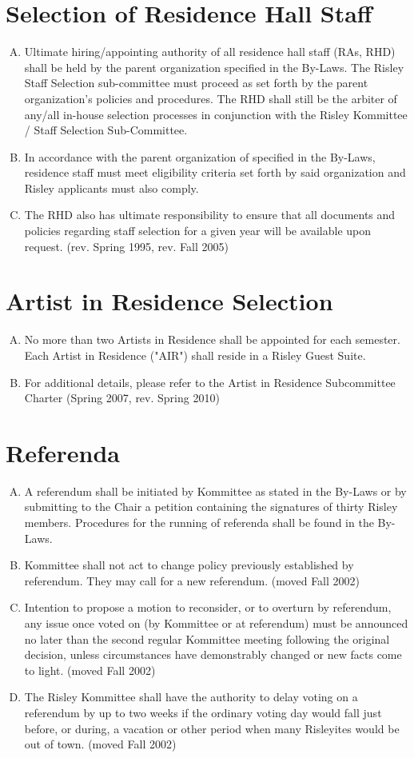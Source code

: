 \documentclass[12pt]{article}
\begin{document}
\section{Selection of Residence Hall Staff}
\begin{enumerate}[A.]
\item Ultimate hiring/appointing authority of all residence hall staff (RAs, RHD) shall be held by the parent organization specified in the By-Laws. The Risley Staff Selection sub-committee must proceed as set forth by the parent organization's policies and procedures. The RHD shall still be the arbiter of any/all in-house selection processes in conjunction with the Risley Kommittee / Staff Selection Sub-Committee.
\item In accordance with the parent organization of specified in the By-Laws, residence staff must meet eligibility criteria set forth by said organization and Risley applicants must also comply.
\item The RHD also has ultimate responsibility to ensure that all documents and policies regarding staff selection for a given year will be available upon request. (rev. Spring 1995, rev. Fall 2005)
\end{enumerate}
\section{Artist in Residence Selection}
\begin{enumerate}[A.]
\item No more than two Artists in Residence shall be appointed for each semester. Each Artist in Residence ("AIR") shall reside in a Risley Guest Suite.
\item For additional details, please refer to the Artist in Residence Subcommittee Charter (Spring 2007, rev. Spring 2010)
\end{enumerate}
\section{Referenda}
\begin{enumerate}[A.]
\item A referendum shall be initiated by Kommittee as stated in the By-Laws or by submitting to the Chair a petition containing the signatures of thirty Risley members. Procedures for the running of referenda shall be found in the By-Laws.
\item Kommittee shall not act to change policy previously established by referendum. They may call for a new referendum. (moved Fall 2002)
\item Intention to propose a motion to reconsider, or to overturn by referendum, any issue once voted on (by Kommittee or at referendum) must be announced no later than the second regular Kommittee meeting following the original decision, unless circumstances have demonstrably changed or new facts come to light. (moved Fall 2002)
\item The Risley Kommittee shall have the authority to delay voting on a referendum by up to two weeks if the ordinary voting day would fall just before, or during, a vacation or other period when many Risleyites would be out of town. (moved Fall 2002)
\end{enumerate}
\end{document}
